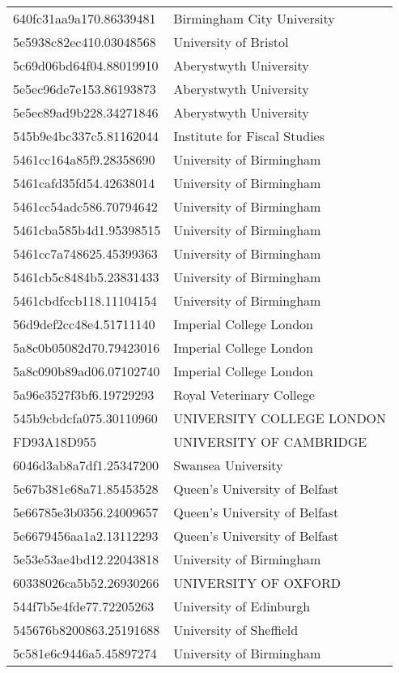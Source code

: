 \begin{tabular}{ll}
640fc31aa9a170.86339481 & Birmingham City University \\
5e5938c82ec410.03048568 & University of Bristol \\
5c69d06bd64f04.88019910 & Aberystwyth University \\
5e5ec96de7e153.86193873 & Aberystwyth University \\
5e5ec89ad9b228.34271846 & Aberystwyth University \\
545b9e4bc337c5.81162044 & Institute for Fiscal Studies \\
5461cc164a85f9.28358690 & University of Birmingham \\
5461cafd35fd54.42638014 & University of Birmingham \\
5461cc54adc586.70794642 & University of Birmingham \\
5461cba585b4d1.95398515 & University of Birmingham \\
5461cc7a748625.45399363 & University of Birmingham \\
5461cb5c8484b5.23831433 & University of Birmingham \\
5461cbdfccb118.11104154 & University of Birmingham \\
56d9def2cc48e4.51711140 & Imperial College London \\
5a8c0b05082d70.79423016 & Imperial College London \\
5a8c090b89ad06.07102740 & Imperial College London \\
5a96e3527f3bf6.19729293 & Royal Veterinary College \\
545b9cbdcfa075.30110960 & UNIVERSITY COLLEGE LONDON \\
FD93A18D955 & UNIVERSITY OF CAMBRIDGE \\
6046d3ab8a7df1.25347200 & Swansea University \\
5e67b381e68a71.85453528 & Queen's University of Belfast \\
5e66785e3b0356.24009657 & Queen's University of Belfast \\
5e6679456aa1a2.13112293 & Queen's University of Belfast \\
5e53e53ae4bd12.22043818 & University of Birmingham \\
60338026ca5b52.26930266 & UNIVERSITY OF OXFORD \\
544f7b5e4fde77.72205263 & University of Edinburgh \\
545676b8200863.25191688 & University of Sheffield \\
5c581e6c9446a5.45897274 & University of Birmingham \\

\end{tabular}
